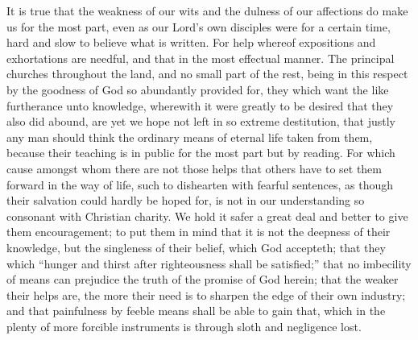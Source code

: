 It is true that the weakness of our wits and the dulness of our affections do make us for the most part, even as our Lord’s own disciples were for a certain time, hard and slow to believe what is written. For help whereof expositions and exhortations are needful, and that in the most effectual manner. The principal churches throughout the land, and no small part of the rest, being in this respect by the goodness of God so abundantly provided for, they which want the like furtherance unto knowledge, wherewith it were greatly to be desired that they also did abound, are yet we hope not left in so extreme destitution, that justly any man should think the ordinary means of eternal life taken from them, because their teaching is in public for the most part but by reading. For which cause amongst whom there are not those helps that others have to set them forward in the way of life, such to dishearten with fearful sentences, as though their salvation could hardly be hoped for, is not in our understanding so consonant with Christian charity.  We hold it safer a great deal and better to give them encouragement;
 to put them in mind that it is not the deepness of their knowledge, but the singleness of their belief, which God accepteth; that they which “hunger and thirst after righteousness shall be satisfied;” that no imbecility of means can prejudice the truth of the promise of God herein; that the weaker their helps are, the more their need is to sharpen the edge of their own industry; and that painfulness by feeble means shall be able to gain that, which in the plenty of more forcible instruments is through sloth and negligence lost.

